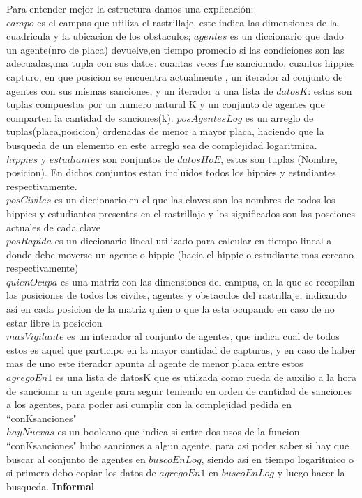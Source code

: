 \disJustificacionDeLaEstructuraElegida
{Para entender mejor la estructura damos una explicaci\'on:\\
$campo$ es el campus que utiliza el rastrillaje, este indica las dimensiones de la cuadricula y la ubicacion de los obstaculos;
$agentes$ es un diccionario que dado un agente(nro de placa) devuelve,en tiempo promedio si las condiciones son las adecuadas,una tupla con sus datos: cuantas veces fue sancionado, cuantos hippies capturo, en que posicion se encuentra actualmente
, un iterador al conjunto de agentes con sus mismas sanciones, y un iterador a una lista de $datosK$: estas son tuplas compuestas por un numero natural K y un conjunto de agentes que comparten la cantidad de sanciones(k).
$posAgentesLog$ es un arreglo de tuplas(placa,posicion) ordenadas de menor a mayor placa, haciendo que la busqueda de un elemento en este arreglo sea de complejidad logaritmica.\\
$hippies$ y $estudiantes$ son conjuntos de $datosHoE$, estos son tuplas (Nombre, posicion). En dichos conjuntos estan incluidos todos los hippies y estudiantes respectivamente.\\
$posCiviles$ es un diccionario en el que las claves son los nombres de todos los hippies y estudiantes presentes en el rastrillaje y los significados son las posciones actuales de cada clave\\
$posRapida$ es un diccionario lineal utilizado para calcular en tiempo lineal a donde debe moverse un agente o hippie (hacia el hippie o estudiante mas cercano respectivamente)\\
$quienOcupa$ es una matriz con las dimensiones del campus, en la que se recopilan las posiciones de todos los civiles, agentes y obstaculos del rastrillaje, indicando así en cada posicion de la matriz quien o que la esta ocupando en caso de no estar libre la posiccion\\
$masVigilante$ es un interador al conjunto de agentes, que indica cual de todos estos es aquel que participo en la mayor cantidad de capturas, y en caso de haber mas de uno este iterador apunta al agente de menor placa entre estos\\
$agregoEn1$ es una lista de datosK que es utilzada como rueda de auxilio a la hora de sancionar a un agente para seguir teniendo en orden de cantidad de sanciones a los agentes, para poder asi cumplir con la complejidad pedida en ``conKsanciones"\\
$hayNuevas$ es un booleano que indica si entre dos usos de la funcion ``conKsanciones" hubo sanciones a algun agente, para asi poder saber si hay que buscar al conjunto de agentes en $buscoEnLog$, siendo así en tiempo logaritmico o si primero debo copiar los datos de $agregoEn1$ en $buscoEnLog$ y luego hacer la busqueda.
}  
\disInvarianteDeRepresentacion
\hspace*{\disSubSubSecMargen}\textbf{\textsf{Informal}}

